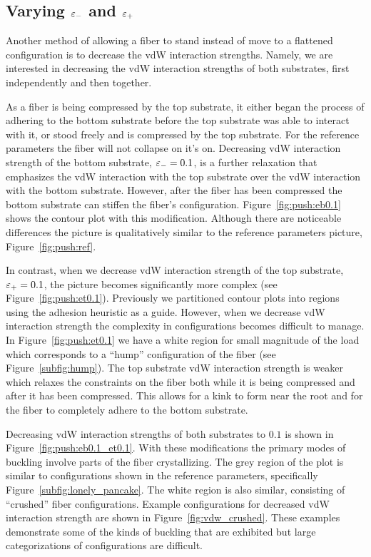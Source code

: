 \subsection{Varying $\varepsilon_-$ and $\varepsilon_+$} \label{subsection:push:eps}

Another method of allowing a fiber to stand instead of move to a flattened configuration is to decrease the vdW interaction strengths. Namely, we are interested in decreasing the vdW interaction strengths of both substrates, first independently and then together.

As a fiber is being compressed by the top substrate, it either began the process of adhering to the bottom substrate before the top substrate was able to interact with it, or stood freely and is compressed by the top substrate. For the reference parameters the fiber will not collapse on it's on. Decreasing vdW interaction strength of the bottom substrate, $\varepsilon_-=0.1$, is a further relaxation that emphasizes the vdW interaction with the top substrate over the vdW interaction with the bottom substrate. However, after the fiber has been compressed the bottom substrate can stiffen the fiber's configuration. Figure~\ref{fig:push:eb0.1} shows the contour plot with this modification. Although there are noticeable differences the picture is qualitatively similar to the reference parameters picture, Figure~\ref{fig:push:ref}.

In contrast, when we decrease vdW interaction strength of the top substrate, $\varepsilon_+=0.1$, the picture becomes significantly more complex (see Figure~\ref{fig:push:et0.1}). Previously we partitioned contour plots into regions using the adhesion heuristic as a guide. However, when we decrease vdW interaction strength the complexity in configurations becomes difficult to manage. In Figure~\ref{fig:push:et0.1} we have a white region for small magnitude of the load which corresponds to a ``hump'' configuration of the fiber (see Figure~\ref{subfig:hump}). The top substrate vdW interaction strength is weaker which relaxes the constraints on the fiber both while it is being compressed and after it has been compressed. This allows for a kink to form near the root and for the fiber to completely adhere to the bottom substrate.

Decreasing vdW interaction strengths of both substrates to $0.1$ is shown in Figure~\ref{fig:push:eb0.1_et0.1}. With these modifications the primary modes of buckling involve parts of the fiber crystallizing. The grey region of the plot is similar to configurations shown in the reference parameters, specifically Figure~\ref{subfig:lonely_pancake}. The white region is also similar, consisting of ``crushed'' fiber configurations. Example configurations for decreased vdW interaction strength are shown in Figure~\ref{fig:vdw_crushed}. These examples demonstrate some of the kinds of buckling that are exhibited but large categorizations of configurations are difficult.
	
